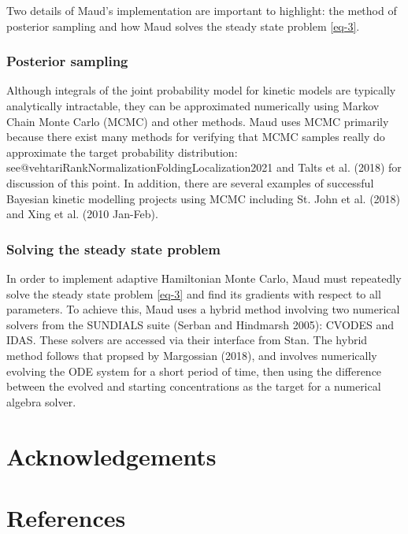 \documentclass[
  letterpaper,
  DIV=11,
  numbers=noendperiod]{scrartcl}
\begin{document}
Two details of Maud's implementation are important to highlight: the
method of posterior sampling and how Maud solves the steady state
problem \eqref{eq-3}.

\hypertarget{posterior-sampling}{%
\subsubsection{Posterior sampling}\label{posterior-sampling}}

Although integrals of the joint probability model for kinetic models are
typically analytically intractable, they can be approximated numerically
using Markov Chain Monte Carlo (MCMC) and other methods. Maud uses MCMC
primarily because there exist many methods for verifying that MCMC
samples really do approximate the target probability distribution:
see@vehtariRankNormalizationFoldingLocalization2021 and Talts et al.
(2018) for discussion of this point. In addition, there are several
examples of successful Bayesian kinetic modelling projects using MCMC
including St. John et al. (2018) and Xing et al. (2010 Jan-Feb).

\hypertarget{solving-the-steady-state-problem}{%
\subsubsection{Solving the steady state
problem}\label{solving-the-steady-state-problem}}

In order to implement adaptive Hamiltonian Monte Carlo, Maud must
repeatedly solve the steady state problem \eqref{eq-3} and find its
gradients with respect to all parameters. To achieve this, Maud uses a
hybrid method involving two numerical solvers from the SUNDIALS suite
(Serban and Hindmarsh 2005): CVODES and IDAS. These solvers are accessed
via their interface from Stan. The hybrid method follows that propsed by
Margossian (2018), and involves numerically evolving the ODE system for
a short period of time, then using the difference between the evolved
and starting concentrations as the target for a numerical algebra
solver.

\hypertarget{acknowledgements}{%
\section{Acknowledgements}\label{acknowledgements}}

\hypertarget{references}{%
\section{References}\label{references}}
\end{document}
